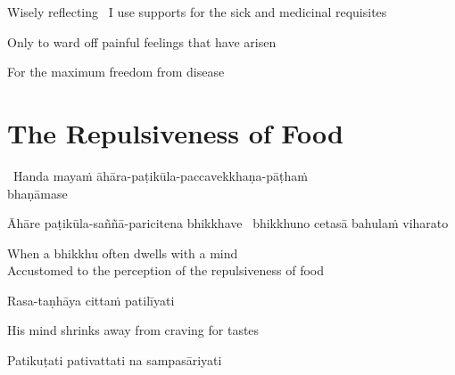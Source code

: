 \begin{english-keep-with}
\begin{english-hang-first-line}
  Wisely reflecting \breathmark\ I use supports for the sick and medicinal requisites\\
\end{english-hang-first-line}
\begin{english-hang-together}
  Only to ward off painful feelings that have arisen\\
\end{english-hang-together}
\begin{english-hang-together}
  For the maximum freedom from disease
\end{english-hang-together}
\end{english-keep-with}

\suttaRef{[MN 2]}

\ifdigitalversion{}\fi



\section{The Repulsiveness of Food}
\label{repulsiveness-of-food}

\begin{leader}
  \anglebracketleft\ \hspace{-0.5mm}Handa mayaṁ āhāra-paṭikūla-paccavekkhaṇa-pāṭhaṁ\\ bhaṇāmase \hspace{-0.5mm}\anglebracketright\
\end{leader}

\begin{pali-hang}
  Āhāre paṭikūla-saññā-paricitena bhikkhave \breathmark\ bhikkhuno cetasā bahulaṁ viharato
\end{pali-hang}

\begin{english}
  When a bhikkhu often dwells with a mind\\
  Accustomed to the perception of the repulsiveness of food
\end{english}

Rasa-taṇhāya cittaṁ patilīyati

\begin{english}
  His mind shrinks away from craving for tastes
\end{english}

Patikuṭati pativattati na sampasāriyati

